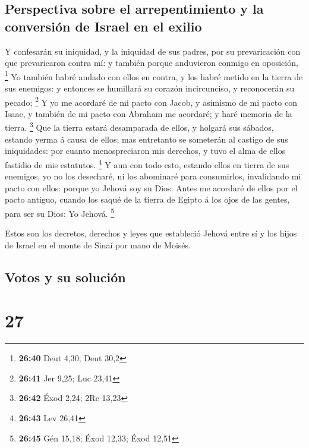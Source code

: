 \hypertarget{perspectiva-sobre-el-arrepentimiento-y-la-conversiuxf3n-de-israel-en-el-exilio}{%
\subsection{Perspectiva sobre el arrepentimiento y la conversión de
Israel en el
exilio}\label{perspectiva-sobre-el-arrepentimiento-y-la-conversiuxf3n-de-israel-en-el-exilio}}

 Y confesarán su iniquidad, y la iniquidad de sus padres,
por su prevaricación con que prevaricaron contra mí: y también porque
anduvieron conmigo en oposición, \footnote{\textbf{26:40} Deut 4,30;
  Deut 30,2}  Yo también habré andado con ellos en contra,
y los habré metido en la tierra de sus enemigos: y entonces se humillará
su corazón incircunciso, y reconocerán su pecado; \footnote{\textbf{26:41}
  Jer 9,25; Luc 23,41}  Y yo me acordaré de mi pacto con
Jacob, y asimismo de mi pacto con Isaac, y también de mi pacto con
Abraham me acordaré; y haré memoria de la tierra. \footnote{\textbf{26:42}
  Éxod 2,24; 2Re 13,23}  Que la tierra estará desamparada
de ellos, y holgará sus sábados, estando yerma á causa de ellos; mas
entretanto se someterán al castigo de sus iniquidades: por cuanto
menospreciaron mis derechos, y tuvo el alma de ellos fastidio de mis
estatutos. \footnote{\textbf{26:43} Lev 26,41}  Y aun con
todo esto, estando ellos en tierra de sus enemigos, yo no los desecharé,
ni los abominaré para consumirlos, invalidando mi pacto con ellos:
porque yo Jehová soy su Dios:  Antes me acordaré de ellos
por el pacto antiguo, cuando los saqué de la tierra de Egipto á los ojos
de las gentes, para ser su Dios: Yo Jehová. \footnote{\textbf{26:45} Gén
  15,18; Éxod 12,33; Éxod 12,51}

 Estos son los decretos, derechos y leyes que estableció
Jehová entre sí y los hijos de Israel en el monte de Sinaí por mano de
Moisés.

\hypertarget{votos-y-su-soluciuxf3n}{%
\subsection{Votos y su solución}\label{votos-y-su-soluciuxf3n}}

\hypertarget{section-26}{%
\section{27}\label{section-26}}

